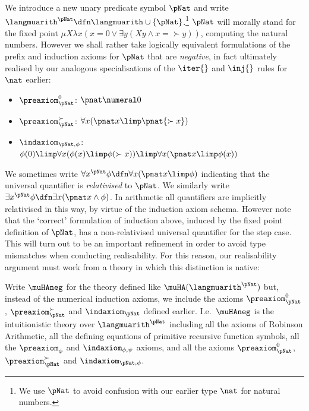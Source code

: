 We introduce a new unary predicate symbol $\pNat $ and write $\langmuarith^\pNat \dfn \langmuarith \cup \{\pNat\}$.\footnote{We use $\pNat$ to avoid confusion with our earlier type $\nat $ for natural numbers.}
$\pNat$ will morally stand for the fixed point $ \mu X\lambda x (x=0 \lor \exists y (Xy \land x=\succ y))$, computing the natural numbers.
However we shall rather take logically equivalent formulations of the prefix and induction axioms for $\pNat$ that are \emph{negative}, in fact ultimately realised by our analogous specialisations of the $\iter{}$ and $\inj{}$ rules for $\nat$ earlier:
\begin{itemize}
    \item $\preaxiom_\pNat^0$: $\pnat \numeral 0$
    \item $\preaxiom_\pNat^\succ$: $\forall x (\pnat x \limp \pnat{ \succ x})$
    \item $\indaxiom_{\pNat,\phi}$:
    $\phi(0) \limp \forall x (\phi(x) \limp \phi(\succ x )) \limp \forall x (\pnat x \limp \phi(x))$
\end{itemize}

We sometimes write $\forall x^\pNat \phi \dfn \forall x (\pnat x \limp \phi)$ indicating that the universal quantifier is \emph{relativised} to $\pNat$.
We similarly write $\exists x^{\pNat} \phi \dfn \exists x (\pnat x \land \phi)$.
In arithmetic all quantifiers are implicitly relativised in this way, by virtue of the induction axiom schema.
However note that the `correct' formulation of induction above, induced by the fixed point definition of $\pNat$, has a non-relativised universal quantifier for the step case. 
This will turn out to be an important refinement in order to avoid type mismatches when conducting realisability. 
For this reason, our realisability argument must work from a theory in which this distinction is native:

\begin{definition}
    Write $\muHAneg$ for the theory defined like $\muHA(\langmuarith^\pNat)$ but, instead of the numerical induction axioms, we include the axioms $\preaxiom_\pNat^0$, $\preaxiom_\pNat^\succ$ and $\indaxiom_\pNat$ defined earlier.
    I.e.\ $\muHAneg$ is the intuitionistic theory over $\langmuarith^\pNat$ including all the axioms of Robinson Arithmetic, all the defining equations of primitive recursive function symbols, all the $\preaxiom_\phi$ and $\indaxiom_{\phi,\psi}$ axioms,  and all the axioms $\preaxiom_\pNat^0$, $\preaxiom_\pNat^\succ$ and $\indaxiom_{\pNat,\phi}$.
\end{definition}


